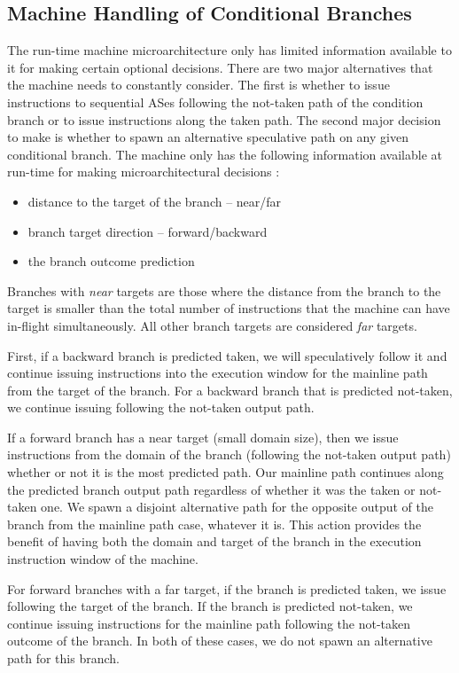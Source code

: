 \documentclass[10pt,dvips]{article}
\begin{document}
\subsection{Machine Handling of Conditional Branches}
%
The run-time machine microarchitecture only has limited information
available to it for making certain optional decisions.
There are two major alternatives that the machine needs to constantly
consider.  The first is whether to issue instructions to sequential
ASes following
the not-taken path of the condition branch or to issue instructions
along the 
taken path.  
The second major decision to make is
whether to spawn an alternative speculative path
on any given conditional branch.
The machine only has the following information
available at run-time for making microarchitectural decisions :

\begin{itemize}
\item{distance to the target of the branch -- near/far}
\item{branch target direction -- forward/backward}
\item{the branch outcome prediction}
\end{itemize}   

Branches with \textit{near} targets are those where
the distance from the branch to the target is smaller than
the total number of instructions that the machine can have
in-flight simultaneously.  All other branch targets are considered
\textit{far} targets.

First, if a backward branch is predicted taken,
we will speculatively follow it and continue issuing instructions
into the execution window for the mainline path from the target
of the branch.  
For a backward branch that
is predicted not-taken, we continue issuing following the
not-taken output path.

If a forward branch has a near target (small domain size), then we
issue instructions from the domain of the branch (following the
not-taken output path) whether or not it is the most predicted path.
Our mainline path continues along the predicted branch output path
regardless of whether it was the taken or not-taken one.  
We spawn a disjoint
alternative path for the opposite output of the branch from
the mainline path case, whatever it is.
This action
provides the benefit of having both the domain and target of the branch
in the execution instruction window of the machine.  

For forward branches with a far target,
if the branch is predicted taken, we issue following the target
of the branch.  If the branch is predicted not-taken, we continue
issuing instructions for the mainline path following the not-taken
outcome of the branch.  In both of these cases, we do not
spawn an alternative path for this branch.
%
\end{document}
